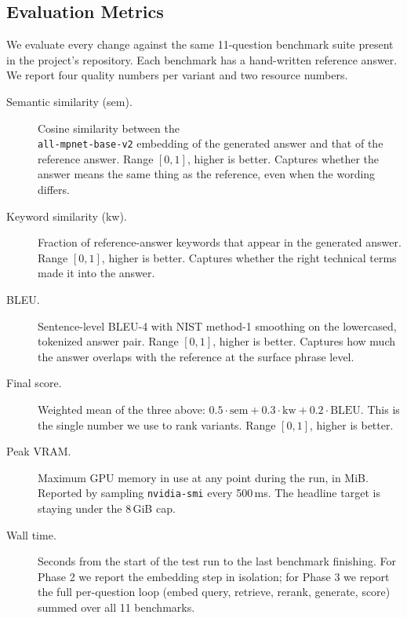 \documentclass[sigconf]{acmart}
\begin{document}
\subsection{Evaluation Metrics}
\label{sec:metrics}

We evaluate every change against the same 11-question benchmark suite
present in the project's repository. Each benchmark has a hand-written
reference answer. We report four quality numbers per variant and two
resource numbers.

\begin{description}
\item[Semantic similarity (sem).] Cosine similarity between the
  \\\texttt{all-mpnet-base-v2} embedding of the generated answer and that
  of the reference answer. Range $[0, 1]$, higher is better. Captures
  whether the answer means the same thing as the reference, even when
  the wording differs.

\item[Keyword similarity (kw).] Fraction of reference-answer keywords
  that appear in the generated answer. Range $[0, 1]$, higher is
  better. Captures whether the right technical terms made it into the
  answer.

\item[BLEU.] Sentence-level BLEU-4 with NIST method-1 smoothing on the
  lowercased, tokenized answer pair. Range $[0, 1]$, higher is better.
  Captures how much the answer overlaps with the reference at the
  surface phrase level.

\item[Final score.] Weighted mean of the three above:
  $0.5 \cdot \text{sem} + 0.3 \cdot \text{kw} + 0.2 \cdot \text{BLEU}$.
  This is the single number we use to rank variants. Range $[0, 1]$,
  higher is better.

\item[Peak VRAM.] Maximum GPU memory in use at any point during the
  run, in MiB. Reported by sampling \texttt{nvidia-smi} every
  500\,ms. The headline target is staying under the 8\,GiB cap.

\item[Wall time.] Seconds from the start of the test run to the last
  benchmark finishing. For Phase 2 we report the embedding step in
  isolation; for Phase 3 we report the full per-question loop
  (embed query, retrieve, rerank, generate, score) summed over all
  11 benchmarks.
\end{description}
\end{document}
